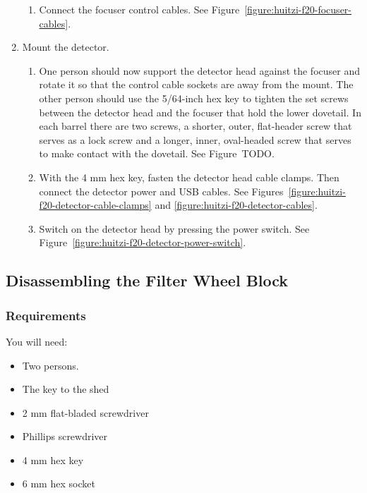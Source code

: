 \begin{enumerate}
\begin{enumerate}
  \item Connect the focuser control cables. See Figure~\ref{figure:huitzi-f20-focuser-cables}.
  
\end{enumerate}


\item Mount the detector.

\begin{enumerate}    

  \item One person should now support the detector head against the focuser and rotate it so that the control cable sockets are away from the mount. The other person should use the 5/64-inch hex key to tighten the set screws between the detector head and the focuser that hold the lower dovetail. In each barrel there are two screws, a shorter, outer, flat-header screw that serves as a lock screw and a longer, inner, oval-headed screw that serves to make contact with the dovetail. See Figure~TODO.

  \item With the 4 mm hex key, fasten the detector head cable clamps. Then connect the detector power and USB cables. See Figures~\ref{figure:huitzi-f20-detector-cable-clamps} and \ref{figure:huitzi-f20-detector-cables}.

  \item Switch on the detector head by pressing the power switch. See Figure~\ref{figure:huitzi-f20-detector-power-switch}.  

\end{enumerate}

\end{enumerate}

\subsection{Disassembling the Filter Wheel Block}

\subsubsection{Requirements}

You will need:

\begin{itemize}
    \item Two persons.
    \item The key to the shed
    \item 2 mm flat-bladed screwdriver
    \item Phillips screwdriver
    \item 4 mm hex key
    \item 6 mm hex socket
\end{itemize}

